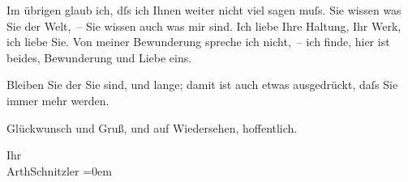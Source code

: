\pstart
           Im übrigen glaub ich, dſs ich Ihnen weiter nicht viel sagen muſs. Sie wissen was Sie
               der Welt, – Sie wissen auch was {\pb}mir sind. Ich liebe Ihre Haltung, Ihr Werk, ich liebe Sie. Von meiner Bewunderung
               spreche ich nicht, – ich finde, hier ist beides, Bewunderung und Liebe eins.\pend
           
\pstart
           Bleiben Sie der Sie sind, und lange; damit ist auch etwas ausgedrückt, daſs Sie immer
               mehr werden.\pend
           
\pstart
           Glückwunsch und Gruß, und auf Wiedersehen, hoffentlich.\pend
           
\pstart
           Ihr{\\[\baselineskip]}\spacefill\mbox{ArthSchnitzler}\pend
           \leftskip=0em{}\endnumbering{}  \newcommand{\dateiname}{L02523}\newcommand{\titel}{Arthur Schnitzler an Thomas Mann, 18. 11. 1929}\newcommand{\editorInnen}{Martin Anton Müller und Gerd-Hermann Susen}

